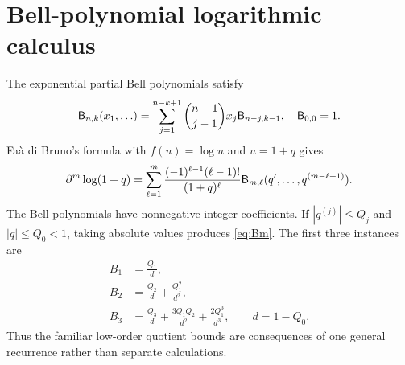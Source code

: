 \section{Bell-polynomial logarithmic calculus}\label{app:bell}

The exponential partial Bell polynomials satisfy
\begin{equation}\label{eq:bell-rec}
\mathsf{B}_{n,k}(x_1,\ldots)=
\sum_{j=1}^{n-k+1}\binom{n-1}{j-1}x_j
\mathsf{B}_{n-j,k-1},
\quad \mathsf{B}_{0,0}=1.
\end{equation}
Fa\`a di Bruno's formula with $f(u)=\log u$ and $u=1+q$ gives
\[
\partial^m\log(1+q)=
\sum_{\ell=1}^m
\frac{(-1)^{\ell-1}(\ell-1)!}{(1+q)^\ell}
\mathsf{B}_{m,\ell}(q',\ldots,q^{(m-\ell+1)}).
\]
The Bell polynomials have nonnegative integer coefficients.  If
$|q^{(j)}|\le Q_j$ and $|q|\le Q_0<1$, taking absolute values produces
\eqref{eq:Bm}.  The first three instances are
\begin{align*}
B_1&=\frac{Q_1}{d},\\
B_2&=\frac{Q_2}{d}+\frac{Q_1^2}{d^2},\\
B_3&=\frac{Q_3}{d}+\frac{3Q_1Q_2}{d^2}
+\frac{2Q_1^3}{d^3},\qquad d=1-Q_0.
\end{align*}
Thus the familiar low-order quotient bounds are consequences of one general
recurrence rather than separate calculations.
